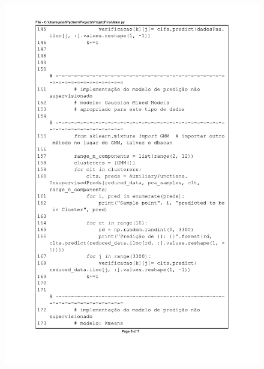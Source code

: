 \begin{figure}[H]
\centering
\includegraphics[scale=0.9]{01_Pre_textuais/code/main5.pdf}
\end{figure}
